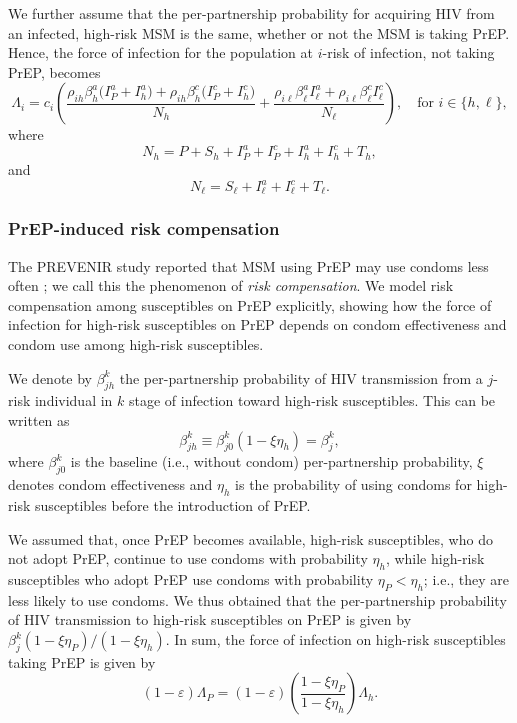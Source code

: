 \documentclass[11pt]{article}
\begin{document}
We further assume that the per-partnership probability for acquiring HIV from an infected, high-risk MSM is the same, whether or not the MSM is taking PrEP. Hence, the force of infection for the population at $i$-risk of infection, not taking PrEP, becomes
\begin{equation}
	\Lambda_i	 = c_i \left( \frac{\rho_{ih} \beta_h^a \big(I_P^a + I_h^a\big) + \rho_{ih} \beta_h^c \big(I_P^c +I_h^c \big)}{N_h} + \frac{\rho_{i\ell} \beta_\ell^a I_\ell^a + \rho_{i\ell} \beta_\ell^c I_\ell^c}{N_\ell}\right), \quad \text{for } i \in\{h,\ell\},
\end{equation}
where
\begin{equation}
N_h = P + S_h + I_P^a + I_P^c + I_h^a + I_h^c + T_h,
\end{equation}
and
\begin{equation}
N_\ell = S_\ell + I_\ell^ a + I_\ell^c + T_\ell.
\end{equation}


\subsubsection{PrEP-induced risk compensation} \label{sec:RiskCompensation}

The PREVENIR study reported that MSM using PrEP may use condoms less often \cite{Molina2018}; we call this the phenomenon of {\it risk compensation}. We model risk compensation among susceptibles on PrEP explicitly, showing how the force of infection for high-risk susceptibles on PrEP depends on condom effectiveness and condom use among high-risk susceptibles.

We denote by $\beta_{jh}^k$ the per-partnership probability of HIV transmission from a $j$-risk individual in $k$ stage of infection toward high-risk susceptibles. This can be written as
 \begin{equation}
 	\beta_{jh}^k \equiv \beta_{j 0}^k(1-\xi \eta_h) = \beta_j^k,
 \end{equation}
where $\beta_{j 0}^k$ is the baseline (i.e., without condom) per-partnership probability, $\xi$ denotes condom effectiveness and $\eta_h$ is the probability of using condoms for high-risk susceptibles before the introduction of PrEP.

We assumed that, once PrEP becomes available, high-risk susceptibles, who do not adopt PrEP, continue to use condoms with probability $\eta_h$, while high-risk susceptibles who adopt PrEP use condoms with probability $\eta_P < \eta_h$; i.e., they are less likely to use condoms. We thus obtained that the per-partnership probability of HIV transmission to high-risk susceptibles on PrEP is given by $\beta_j^k (1-\xi \eta_P)/(1-\xi \eta_h)$. In sum, the force of infection on high-risk susceptibles taking PrEP is given by
\begin{equation}
	(1-\varepsilon) \Lambda_P = (1-\varepsilon) \left(\frac{1-\xi \eta_P}{1-\xi \eta_h}\right) \Lambda_h.
\end{equation}
\end{document}
